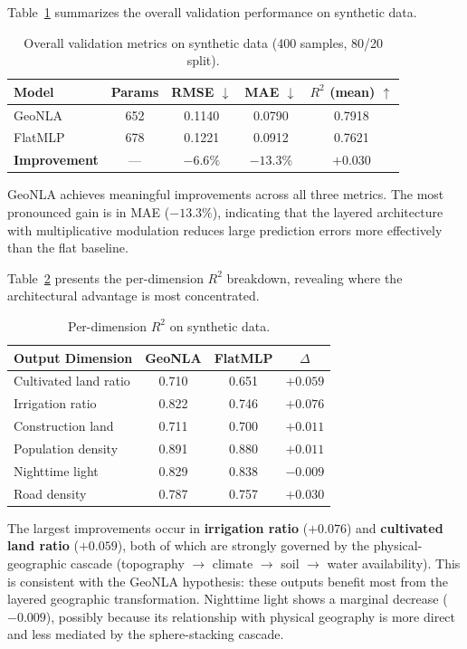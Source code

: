 \documentclass[a4paper,11pt]{article}
\begin{document}
Table~\ref{tab:synthetic_overall} summarizes the overall validation performance on synthetic data.

\begin{table}[htbp]
\centering
\caption{Overall validation metrics on synthetic data (400 samples, 80/20 split).}
\label{tab:synthetic_overall}
\begin{tabular}{lcccc}
\toprule
Model & Params & RMSE $\downarrow$ & MAE $\downarrow$ & $R^2$ (mean) $\uparrow$ \\
\midrule
GeoNLA & 652 & 0.1140 & 0.0790 & 0.7918 \\
FlatMLP & 678 & 0.1221 & 0.0912 & 0.7621 \\
\textbf{Improvement} & --- & \textbf{$-6.6\%$} & \textbf{$-13.3\%$} & \textbf{$+0.030$} \\
\bottomrule
\end{tabular}
\end{table}

GeoNLA achieves meaningful improvements across all three metrics. The most pronounced gain is in MAE ($-13.3\%$), indicating that the layered architecture with multiplicative modulation reduces large prediction errors more effectively than the flat baseline.

Table~\ref{tab:synthetic_perdim} presents the per-dimension $R^2$ breakdown, revealing where the architectural advantage is most concentrated.

\begin{table}[htbp]
\centering
\caption{Per-dimension $R^2$ on synthetic data.}
\label{tab:synthetic_perdim}
\begin{tabular}{lccc}
\toprule
Output Dimension & GeoNLA & FlatMLP & $\Delta$ \\
\midrule
Cultivated land ratio & 0.710 & 0.651 & $+0.059$ \\
Irrigation ratio & 0.822 & 0.746 & $+0.076$ \\
Construction land & 0.711 & 0.700 & $+0.011$ \\
Population density & 0.891 & 0.880 & $+0.011$ \\
Nighttime light & 0.829 & 0.838 & $-0.009$ \\
Road density & 0.787 & 0.757 & $+0.030$ \\
\bottomrule
\end{tabular}
\end{table}

The largest improvements occur in \textbf{irrigation ratio} ($+0.076$) and \textbf{cultivated land ratio} ($+0.059$), both of which are strongly governed by the physical-geographic cascade (topography $\to$ climate $\to$ soil $\to$ water availability). This is consistent with the GeoNLA hypothesis: these outputs benefit most from the layered geographic transformation. Nighttime light shows a marginal decrease ($-0.009$), possibly because its relationship with physical geography is more direct and less mediated by the sphere-stacking cascade.
\end{document}
